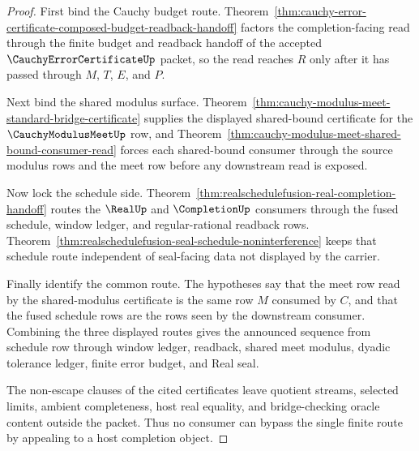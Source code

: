\begin{proof}
First bind the Cauchy budget route. Theorem~\ref{thm:cauchy-error-certificate-composed-budget-readback-handoff} factors the completion-facing read through the finite budget and readback handoff of the accepted $\CauchyErrorCertificateUp$ packet, so the read reaches $R$ only after it has passed through $M$, $T$, $E$, and $P$.

Next bind the shared modulus surface. Theorem~\ref{thm:cauchy-modulus-meet-standard-bridge-certificate} supplies the displayed shared-bound certificate for the $\CauchyModulusMeetUp$ row, and Theorem~\ref{thm:cauchy-modulus-meet-shared-bound-consumer-read} forces each shared-bound consumer through the source modulus rows and the meet row before any downstream read is exposed.

Now lock the schedule side. Theorem~\ref{thm:realschedulefusion-real-completion-handoff} routes the $\RealUp$ and $\CompletionUp$ consumers through the fused schedule, window ledger, and regular-rational readback rows. Theorem~\ref{thm:realschedulefusion-seal-schedule-noninterference} keeps that schedule route independent of seal-facing data not displayed by the carrier.

Finally identify the common route. The hypotheses say that the meet row read by the shared-modulus certificate is the same row $M$ consumed by $C$, and that the fused schedule rows are the rows seen by the downstream consumer. Combining the three displayed routes gives the announced sequence from schedule row through window ledger, readback, shared meet modulus, dyadic tolerance ledger, finite error budget, and Real seal.

The non-escape clauses of the cited certificates leave quotient streams, selected limits, ambient completeness, host real equality, and bridge-checking oracle content outside the packet. Thus no consumer can bypass the single finite route by appealing to a host completion object.
\end{proof}

